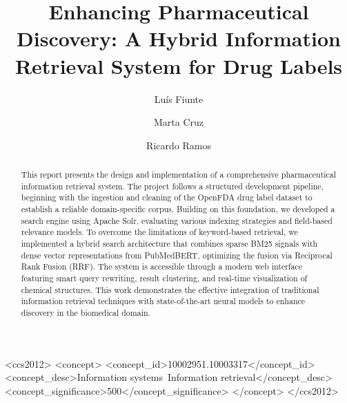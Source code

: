 \documentclass[sigconf, pbalance]{acmart}
\author{Lu\'is Fiunte}
\affiliation{%
  \institution{FEUP, Universidade do Porto}
  \city{Porto}
  \country{Portugal}
}
\author{Marta Cruz}
\affiliation{%
  \institution{FEUP, Universidade do Porto}
  \city{Porto}
  \country{Portugal}
}
\author{Ricardo Ramos}
\affiliation{%
  \institution{FEUP, Universidade do Porto}
  \city{Porto}
  \country{Portugal}
}
\begin{document}
\title[Enhancing Pharmaceutical Discovery: A Hybrid Information Retrieval System for Drug Labels]{%
  Enhancing Pharmaceutical Discovery: A Hybrid Information Retrieval System for Drug Labels
}

\begin{abstract}
  This report presents the design and implementation of a comprehensive pharmaceutical information retrieval system. The project follows a structured development pipeline, beginning with the ingestion and cleaning of the OpenFDA drug label dataset to establish a reliable domain-specific corpus. Building on this foundation, we developed a search engine using Apache Solr, evaluating various indexing strategies and field-based relevance models. To overcome the limitations of keyword-based retrieval, we implemented a hybrid search architecture that combines sparse BM25 signals with dense vector representations from PubMedBERT, optimizing the fusion via Reciprocal Rank Fusion (RRF). The system is accessible through a modern web interface featuring smart query rewriting, result clustering, and real-time visualization of chemical structures. This work demonstrates the effective integration of traditional information retrieval techniques with state-of-the-art neural models to enhance discovery in the biomedical domain.
\end{abstract}

\begin{CCSXML}
  <ccs2012>
  <concept>
  <concept_id>10002951.10003317</concept_id>
  <concept_desc>Information systems~Information retrieval</concept_desc>
  <concept_significance>500</concept_significance>
  </concept>
  </ccs2012>
\end{CCSXML}



\maketitle









\clearpage




\appendix

\end{document}
